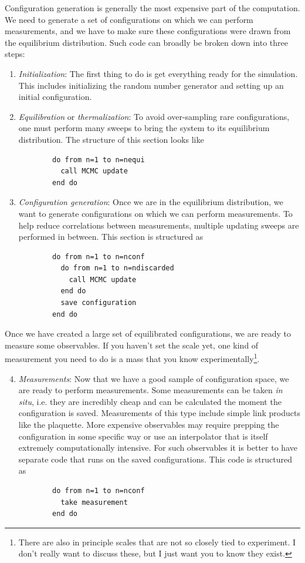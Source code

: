 Configuration generation is generally the most expensive part of the computation. 
We need to generate a set of
configurations on which we can perform measurements, and we have to make sure
these configurations were drawn from the equilibrium distribution. Such code can
broadly be broken down into three steps:
\begin{enumerate}
  \item {\it Initialization}: The first thing to do is get everything ready for
        the simulation. This includes initializing the random number generator
        and setting up an initial configuration.
  \item {\it Equilibration} or {\it thermalization}:
        To avoid over-sampling rare configurations,
        one must perform many sweeps to bring the system to its equilibrium
        distribution. The structure of this section looks like
        \begin{verbatim}
        do from n=1 to n=nequi 
          call MCMC update
        end do
        \end{verbatim}
  \item {\it Configuration generation}: Once we are in the equilibrium
        distribution, we want to generate configurations on which we can
        perform measurements. To help reduce correlations between
        measurements, multiple updating sweeps are performed in between.
        This section is structured as
        \begin{verbatim}
        do from n=1 to n=nconf
          do from n=1 to n=ndiscarded
            call MCMC update
          end do
          save configuration 
        end do
        \end{verbatim}
\end{enumerate}
Once we have created a large set of equilibrated configurations, we are ready to
measure some observables. If you haven't set the scale yet, one kind of
measurement you need to do is a mass that you know experimentally\footnote{There
are also in principle scales that are not so closely tied to experiment. I don't
really want to discuss these, but I just want you to know they exist.}.
\begin{enumerate}
\setcounter{enumi}{3}
  \item {\it Measurements}: Now that we have a good sample of configuration
        space, we are ready to perform measurements. Some measurements
        can be taken {\it in situ}, i.e. they are incredibly cheap and can be
        calculated the moment the configuration is saved. Measurements of this
        type include simple link products like the plaquette. More expensive
        observables may require prepping the configuration in some specific way
        or use an interpolator that is itself extremely computationally
        intensive. For such observables it is better to
        have separate code that runs on the saved configurations. This
        code is structured as
        \begin{verbatim}
        do from n=1 to n=nconf
          take measurement 
        end do
        \end{verbatim}
\end{enumerate}
